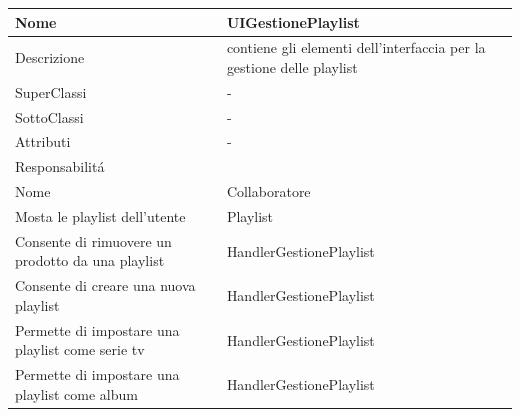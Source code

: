 \begin{center} %
    \begin{longtable}{ |p{3cm}|p{3cm}|p{3cm}|p{3cm}| }
        \hline
        Nome & \multicolumn{3}{|p{9cm}|}{UIGestionePlaylist} \\\hline
        Descrizione & \multicolumn{3}{|p{9cm}|}{contiene gli elementi dell'interfaccia per la gestione delle playlist} \\\hline
        SuperClassi & \multicolumn{3}{|p{9cm}|}{-} \\\hline
        SottoClassi & \multicolumn{3}{|p{9cm}|}{-} \\\hline
        Attributi & \multicolumn{3}{|p{9cm}|}{-} \\\hline
        \multicolumn{4}{|p{12cm}|}{Responsabilit\'a} \\\hline %
        \multicolumn{2}{|p{6cm}|}{Nome} & \multicolumn{2}{|p{6cm}|}{Collaboratore} \\\hline
        \multicolumn{2}{|p{6cm}|}{Mosta le playlist dell'utente} & \multicolumn{2}{|p{6cm}|}{Playlist} \\\hline
        \multicolumn{2}{|p{6cm}|}{Consente di rimuovere un prodotto da una playlist} & \multicolumn{2}{|p{6cm}|}{HandlerGestionePlaylist} \\\hline
        \multicolumn{2}{|p{6cm}|}{Consente di creare una nuova playlist} & \multicolumn{2}{|p{6cm}|}{HandlerGestionePlaylist} \\\hline
        \multicolumn{2}{|p{6cm}|}{Permette di impostare una playlist come serie tv} & \multicolumn{2}{|p{6cm}|}{HandlerGestionePlaylist} \\\hline
        \multicolumn{2}{|p{6cm}|}{Permette di impostare una playlist come album} & \multicolumn{2}{|p{6cm}|}{HandlerGestionePlaylist} \\\hline
    \end{longtable}
\end{center}

